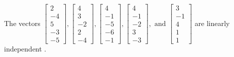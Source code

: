 \begin{exercise}
\begin{exerciseStatement}
  \end{exerciseStatement}
  \begin{exerciseAnswer}
   The vectors \(\left[\begin{array}{r}
2 \\
-4 \\
5 \\
-3 \\
-5
\end{array}\right] , \left[\begin{array}{r}
4 \\
3 \\
-2 \\
2 \\
-4
\end{array}\right] , \left[\begin{array}{r}
4 \\
-1 \\
-5 \\
-6 \\
-1
\end{array}\right] , \left[\begin{array}{r}
4 \\
-1 \\
-2 \\
3 \\
-3
\end{array}\right] , \text{ and } \left[\begin{array}{r}
3 \\
-1 \\
4 \\
1 \\
1
\end{array}\right]\) are 
  	 linearly independent  .
  


  \end{exerciseAnswer}
\end{exercise}